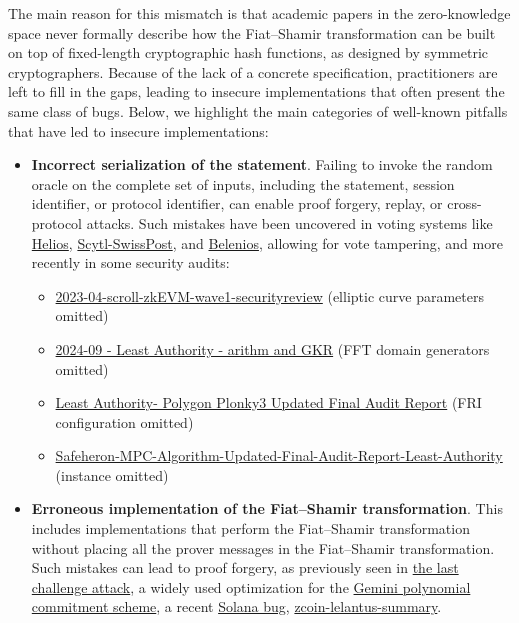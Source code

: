 \documentclass{article}
\begin{document}
The main reason for this mismatch is that academic papers in the zero-knowledge space never formally describe how the Fiat--Shamir transformation can be built on top of fixed-length cryptographic hash functions, as designed by symmetric cryptographers. Because of the lack of a concrete specification, practitioners are left to fill in the gaps, leading to insecure implementations that often present the same class of bugs. Below, we highlight the main categories of well-known pitfalls that have led to insecure implementations:

\begin{itemize}
    \item \textbf{Incorrect serialization of the statement}. Failing to invoke the random oracle on the complete set of inputs, including the statement, session identifier, or protocol identifier, can enable proof forgery, replay, or cross-protocol attacks. Such mistakes have been uncovered in voting systems like \href{https://eprint.iacr.org/2016/771}{Helios}, \href{https://ieeexplore.ieee.org/document/9152765}{Scytl-SwissPost}, and \href{https://inria.hal.science/hal-02928953/file/final.pdf}{Belenios}, allowing for vote tampering, and more recently in some security audits:
    \begin{itemize}
    \item
\href{https://github.com/trailofbits/publications/blob/master/reviews/2023-04-scroll-zkEVM-wave1-securityreview.pdf}{\textsf{2023-04-scroll-zkEVM-wave1-securityreview}} (elliptic curve parameters omitted)
\item \href{https://github.com/Consensys/gnark/blob/master/audits/2024-09\%20-\%20Least\%20Authority\%20-\%20arithm\%20and\%20GKR.pdf}{\textsf{2024-09 - Least Authority - arithm and GKR}} (FFT domain generators omitted)
\item \href{https://leastauthority.com/wp-content/uploads/2024/11/Updated\_071124\_Polygon\_Plonky3\_Final\_Audit\_Report.pdf}{\textsf{Least Authority- Polygon Plonky3 Updated Final Audit Report}} (FRI configuration omitted)
\item \href{https://leastauthority.com/wp-content/uploads/2023/10/Safeheron_MPC_Algorithm_Updated_Final_Audit_Report_Least_Authority.pdf}{\textsf{Safeheron-MPC-Algorithm-Updated-Final-Audit-Report-Least-Authority}} (instance omitted)
    \end{itemize}
    \item \textbf{Erroneous implementation of the Fiat--Shamir transformation}. This includes implementations that perform the Fiat--Shamir transformation without placing all the prover messages in the Fiat--Shamir transformation. Such mistakes can lead to proof forgery, as previously seen in \href{https://www.youtube.com/watch?v=Sk-S8-n6Jo4}{the last challenge attack}, a widely used optimization for the \href{https://eprint.iacr.org/2025/565}{Gemini polynomial commitment scheme}, a recent \href{https://t.co/RFaHQOtAAq}{Solana bug},
    \href{https://github.com/trailofbits/publications/blob/master/reviews/zcoin-lelantus-summary}{zcoin-lelantus-summary}.


\end{itemize}
\end{document}
